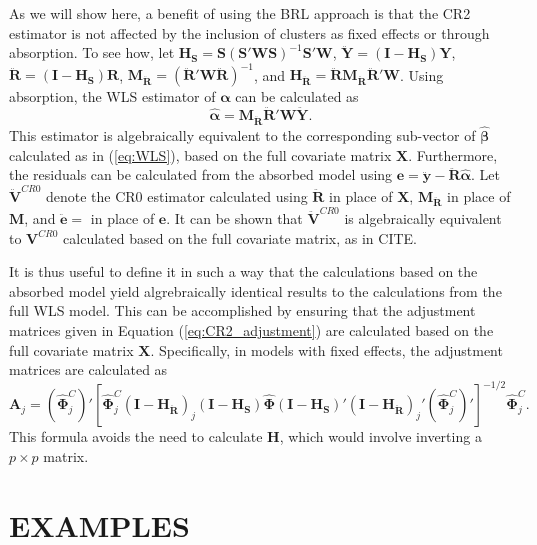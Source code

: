 \documentclass[12pt]{article}
\newcommand{\bm}{\mathbf}
\newcommand{\bs}{\boldsymbol}
\begin{document}
As we will show here, a benefit of using the BRL approach is that the CR2 estimator is not affected by the inclusion of clusters as fixed effects or through absorption. To see how, let $\bm{H_S} = \bm{S}\left(\bm{S}'\bm{W}\bm{S}\right)^{-1} \bm{S}'\bm{W}$, $\bm{\ddot{Y}} = \left(\bm{I} - \bm{H_S}\right)\bm{Y}$, $\bm{\ddot{R}} = \left(\bm{I} - \bm{H_S}\right)\bm{R}$, $\bm{M_{\ddot{R}}} = \left(\bm{\ddot{R}}' \bm{W} \bm{\ddot{R}}\right)^{-1}$, and $\bm{H_{\ddot{R}}} = \bm{\ddot{R}}\bm{M_{\ddot{R}}} \bm{\ddot{R}}' \bm{W}$. 
Using absorption, the WLS estimator of $\bs\alpha$ can be calculated as \[
\bs{\hat\alpha} = \bm{M_{\ddot{R}}} \bm{\ddot{R}}' \bm{W} \bm{\ddot{Y}}. \]
This estimator is algebraically equivalent to the corresponding sub-vector of $\bs{\hat\beta}$  calculated as in (\ref{eq:WLS}), based on the full covariate matrix $\bm{X}$. 
Furthermore, the residuals can be calculated from the absorbed model using $\bm{e} = \bm{\ddot{y}} - \bm{\ddot{R}} \bs{\hat\alpha}$.
Let $\bm{\ddot{V}}^{CR0}$ denote the CR0 estimator calculated using $\bm{\ddot{R}}$ in place of $\bm{X}$, $\bm{M_{\ddot{R}}}$ in place of $\bm{M}$, and $\bm{\ddot{e}} = $ in place of $\bm{e}$. It can be shown that $\bm{\ddot{V}}^{CR0}$ is algebraically equivalent to $\bm{V}^{CR0}$ calculated based on the full covariate matrix, as in CITE.

It is thus useful to define it in such a way that the calculations based on the absorbed model yield algrebraically identical results to the calculations from the full WLS model. 
This can be accomplished by ensuring that the adjustment matrices given in Equation (\ref{eq:CR2_adjustment}) are calculated based on the full covariate matrix $\bm{X}$. Specifically, in models with fixed effects, the adjustment matrices are calculated as
\begin{equation}
\label{eq:CR2_panel_adjustment}
\bm{A}_j = \left(\hat{\bs\Phi}_j^C\right)' \left[\hat{\bs\Phi}_j^C\left(\bm{I} - \bm{H_{\ddot{R}}}\right)_j \left(\bm{I} - \bm{H_S}\right) \hat{\bs\Phi} \left(\bm{I} - \bm{H_S}\right)' \left(\bm{I} - \bm{H_{\ddot{R}}}\right)_j' \left(\hat{\bs\Phi}_j^C\right)' \right]^{-1/2}\hat{\bs\Phi}_j^C.
\end{equation}
This formula avoids the need to calculate $\bm{H}$, which would involve inverting a $p \times p$ matrix.




\section{EXAMPLES}
\label{subsec:examples_F}
\end{document}
